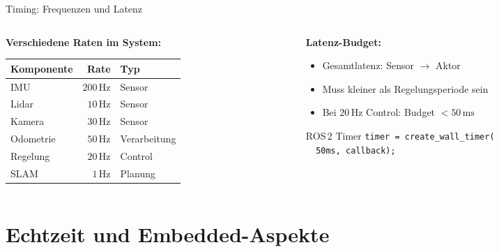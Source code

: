 \documentclass[%
  aspectratio=169,
  10pt
]{beamer}
\newcommand{\SI}[2]{#1\,\text{#2}}
\begin{document}
\begin{frame}[fragile]{Timing: Frequenzen und Latenz}

\begin{columns}[T]
  \begin{column}{0.55\textwidth}
    \textbf{Verschiedene Raten im System:}

    \vspace{1mm}
    \begin{tabular}{lrl}
      \toprule
      \textbf{Komponente} & \textbf{Rate} & \textbf{Typ} \\
      \midrule
      IMU                 & $\SI{200}{Hz}$  & Sensor \\
      Lidar               & $\SI{10}{Hz}$   & Sensor \\
      Kamera              & $\SI{30}{Hz}$   & Sensor \\
      Odometrie           & $\SI{50}{Hz}$   & Verarbeitung \\
      Regelung            & $\SI{20}{Hz}$   & Control \\
      SLAM                & $\SI{1}{Hz}$    & Planung \\
      \bottomrule
    \end{tabular}
  \end{column}
  \begin{column}{0.40\textwidth}
    \textbf{Latenz-Budget:}
    \begin{itemize}
      \item Gesamtlatenz: Sensor $\rightarrow$ Aktor
      \item Muss kleiner als Regelungsperiode sein
      \item Bei $\SI{20}{Hz}$ Control:
            Budget $< \SI{50}{ms}$
    \end{itemize}

    \vspace{2mm}
    \begin{exampleblock}{ROS\,2 Timer}
      \texttt{timer = create\_wall\_timer(}\\
      \texttt{~~50ms, callback);}
    \end{exampleblock}
  \end{column}
\end{columns}

\end{frame}


\section{Echtzeit und Embedded-Aspekte}
\end{document}
